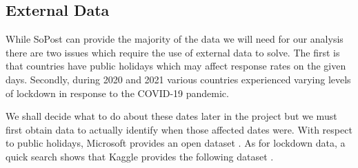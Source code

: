 \documentclass[12pt]{scrartcl}
\begin{document}



\subsection{External Data}

While SoPost can provide the majority of the data we will need for our
analysis there are two issues which require the use of external data to solve.
The first is that countries have public holidays which may affect response
rates on the given days. Secondly, during 2020 and 2021 various countries
experienced varying levels of lockdown in response to the COVID-19 pandemic.

We shall decide what to do about these dates later in the project but we
must first obtain data to actually identify when those affected dates were.
With respect to public holidays, Microsoft provides an open dataset \cite{ms:public-hols}.
As for lockdown data, a quick search shows that Kaggle provides the following
dataset \cite{kaggle:lockdowns}.



\end{document}
